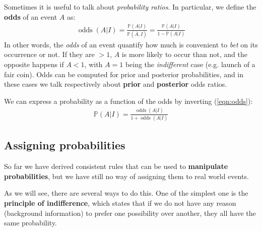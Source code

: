 \documentclass[../template.tex]{subfiles}
\begin{document}
Sometimes it is useful to talk about \textit{probability ratios}. In particular, we define the \textbf{odds} of an event $A$ as:
\begin{align}\label{eqn:odds}
    \operatorname{odds}(A|I) = \frac{\mathbb{P}(A|I)}{\mathbb{P}(\bar{A},I)} = \frac{\mathbb{P}(A|I)}{1-\mathbb{P}(A|I)} 
\end{align}  
In other words, the \textit{odds} of an event quantify how much is convenient to \textit{bet} on its occurrence or not. If they are $>1$, $A$ is more likely to occur than not, and the opposite happens if $A < 1$, with $A=1$ being the \textit{indifferent} case (e.g. launch of a fair coin). Odds can be computed for prior and posterior probabilities, and in these cases we talk respectively about \textbf{prior} and \textbf{posterior} odds ratios.      

\medskip

We can express a probability as a function of the odds by inverting (\ref{eqn:odds}):
\begin{align*}
    \mathbb{P}(A|I) = \frac{\operatorname{odds}(A|I) }{1 + \operatorname{odds}(A|I) } 
\end{align*}

\subsection{Assigning probabilities}
So far we have derived consistent rules that can be used to \textbf{manipulate probabilities}, but we have still no way of assigning them to real world events.

\medskip

As we will see, there are several ways to do this. One of the simplest one is the \textbf{principle of indifference}, which states that if we do not have any reason (background information) to prefer one possibility over another, they all have the same probability.

\medskip
\end{document}
